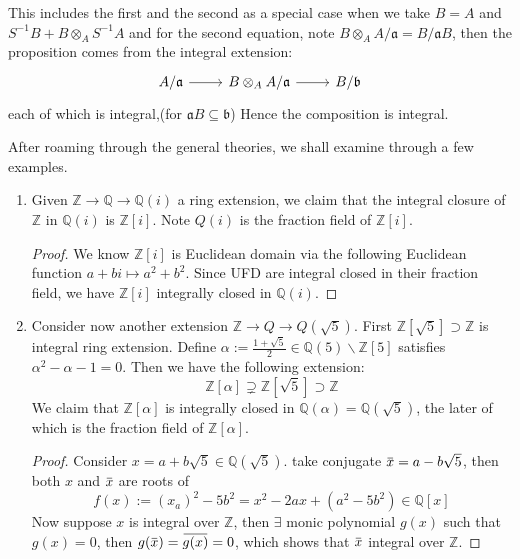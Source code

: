 \documentclass[12pt]{article}
\theoremstyle{definition}
\theoremstyle{plain}
\newcommand{\rat}{\mathbb{Q}}
\newcommand{\z}{\mathbb{Z}}
\newcommand{\overbar}[1]{\mkern 1.5mu\overline{\mkern-1.5mu#1\mkern-1.5mu}\mkern 1.5mu}
\renewcommand{\bar}{\overbar}
\begin{document}
\medskip
This includes the first and the second as a special case when we take $B=A$ and $S^{-1}B+B\otimes_A S^{-1}A$ and for the second
equation, note $B\otimes_A A/\mathfrak{a}=B/\mathfrak{a}B$, then the proposition comes from the integral extension:
\begin{equation}
  \begin{tikzcd}
    A/\mathfrak{a}\ar{r} &B\otimes_A A/\mathfrak{a}\ar{r}&B/\mathfrak{b}
  \end{tikzcd}
\end{equation}
each of which is integral,(for $\mathfrak{a}B\subseteq \mathfrak{b}$) Hence the composition is integral.

\medskip
After roaming through the general theories, we shall examine through a few examples.
\begin{enumerate}
\item Given $\z\to \rat\to \rat(i)$ a ring extension, we claim that the integral closure of $\z$ in $\rat(i)$ is $\z[i]$. Note $Q(i)$ is the fraction field of $\z[i]$.
    \begin{proof}
      We know $\z[i]$ is Euclidean domain via the following Euclidean function $a+bi\mapsto a^2+b^2$. Since UFD are integral closed in their fraction field, we have $\z[i]$ integrally closed in $\rat(i)$.
    \end{proof}
\item Consider now another extension $\z\to Q\to Q(\sqrt{5})$. First $\z[\sqrt{5}]\supset \z$ is integral ring extension. Define $\alpha:=\frac{1+\sqrt{5}}{2}\in \rat(5)\backslash\z[5]$ satisfies $\alpha^2-\alpha-1=0$. Then we have the following extension:
      \begin{equation}
        \z[\alpha]\supsetneq \z[\sqrt{5}]\supset \z
      \end{equation}
      We claim that $\z[\alpha]$ is integrally closed in $\rat(\alpha)=\rat(\sqrt{5})$, the later of which is the fraction field of $\z[\alpha]$.
       \begin{proof}
       Consider $x=a+b\sqrt{5}\in \rat(\sqrt{5})$. take conjugate $\bar{x}=a-b\sqrt{5}$, then both $x$ and $\bar{x}$ are roots of
      \[f(x):=(x_a)^2-5b^2=x^2-2ax+(a^2-5b^2)\in \rat[x]\]
       Now suppose $x$ is integral over $\z$, then $\exists$ monic polynomial $g(x)$ such that $g(x)=0$, then $g(\bar{x})=\bar{g(x)}=0$, which shows that $\bar{x}$ integral over $\z$.


\end{proof}
\end{enumerate}
\end{document}
